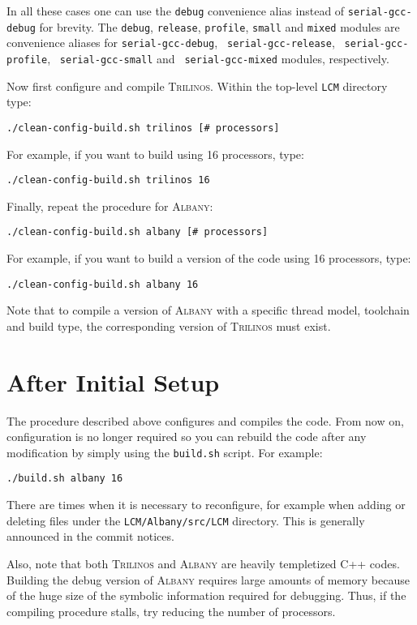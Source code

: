 \documentclass{article}
\newcommand{\trilinos}{\textsc{Trilinos}}
\newcommand{\albany}{\textsc{Albany}}
\begin{document}
In all these cases one can use the \verb+debug+ convenience alias instead of
\verb+serial-gcc-debug+ for brevity. The \verb+debug+, \verb+release+,
\verb+profile+, \verb+small+ and \verb+mixed+ modules are convenience aliases
for \verb+serial-gcc-debug+, \verb+ serial-gcc-release+,
\verb+ serial-gcc-profile+, \verb+ serial-gcc-small+ and
\verb+ serial-gcc-mixed+ modules, respectively.

Now first configure and compile \trilinos{}. Within the top-level
\verb+LCM+ directory type:
\begin{verbatim}
./clean-config-build.sh trilinos [# processors]
\end{verbatim}
For example, if you want to build using 16 processors, type:
\begin{verbatim}
./clean-config-build.sh trilinos 16
\end{verbatim}
Finally, repeat the procedure for \albany{}:
\begin{verbatim}
./clean-config-build.sh albany [# processors]
\end{verbatim}
For example, if you want to build a version of the code using 16
processors, type:
\begin{verbatim}
./clean-config-build.sh albany 16
\end{verbatim}

Note that to compile a version of \albany{} with a specific thread model,
toolchain and build type, the corresponding version of \trilinos{} must
exist.

\section{After Initial Setup}
The procedure described above configures and compiles the code. From
now on, configuration is no longer required so you can rebuild the
code after any modification by simply using the \verb+build.sh+
script. For example:
\begin{verbatim}
./build.sh albany 16
\end{verbatim}
There are times when it is necessary to reconfigure, for example when
adding or deleting files under the \verb+LCM/Albany/src/LCM+
directory. This is generally announced in the commit notices.

Also, note that both \trilinos{} and \albany{} are heavily templetized
C++ codes. Building the debug version of \albany{} requires large
amounts of memory because of the huge size of the symbolic information
required for debugging. Thus, if the compiling procedure stalls, try
reducing the number of processors.
\end{document}
